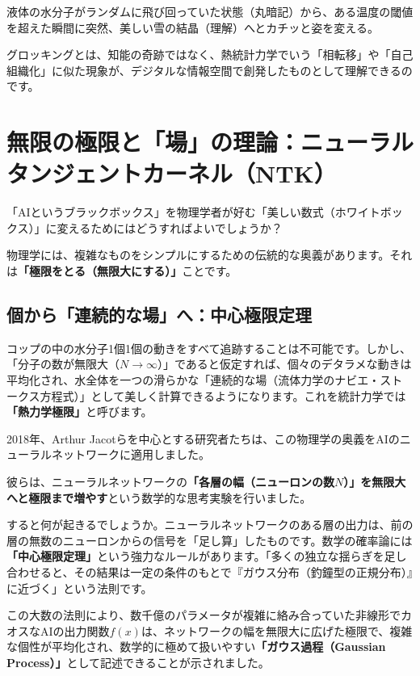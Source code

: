 液体の水分子がランダムに飛び回っていた状態（丸暗記）から、ある温度の閾値を超えた瞬間に突然、美しい雪の結晶（理解）へとカチッと姿を変える。

グロッキングとは、知能の奇跡ではなく、熱統計力学でいう「相転移」や「自己組織化」に似た現象が、デジタルな情報空間で創発したものとして理解できるのです。

\section{無限の極限と「場」の理論：ニューラルタンジェントカーネル（NTK）}

「AIというブラックボックス」を物理学者が好む「美しい数式（ホワイトボックス）」に変えるためにはどうすればよいでしょうか？

物理学には、複雑なものをシンプルにするための伝統的な奥義があります。それは\textbf{「極限をとる（無限大にする）」}ことです。

\subsection{個から「連続的な場」へ：中心極限定理}

コップの中の水分子1個1個の動きをすべて追跡することは不可能です。しかし、「分子の数が無限大（\(N \to \infty\)）」であると仮定すれば、個々のデタラメな動きは平均化され、水全体を一つの滑らかな「連続的な場（流体力学のナビエ・ストークス方程式）」として美しく計算できるようになります。これを統計力学では\textbf{「熱力学極限」}と呼びます。

2018年、Arthur Jacotらを中心とする研究者たちは、この物理学の奥義をAIのニューラルネットワークに適用しました。

彼らは、ニューラルネットワークの\textbf{「各層の幅（ニューロンの数\(N\)）」を無限大へと極限まで増やす}という数学的な思考実験を行いました。

すると何が起きるでしょうか。ニューラルネットワークのある層の出力は、前の層の無数のニューロンからの信号を「足し算」したものです。数学の確率論には\textbf{「中心極限定理」}という強力なルールがあります。「多くの独立な揺らぎを足し合わせると、その結果は一定の条件のもとで『ガウス分布（釣鐘型の正規分布）』に近づく」という法則です。

この大数の法則により、数千億のパラメータが複雑に絡み合っていた非線形でカオスなAIの出力関数\(f(x)\)は、ネットワークの幅を無限大に広げた極限で、複雑な個性が平均化され、数学的に極めて扱いやすい\textbf{「ガウス過程（Gaussian Process）」}として記述できることが示されました。

